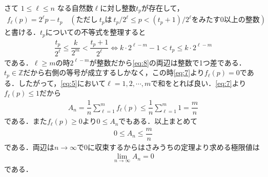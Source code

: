 \documentclass[../../main.tex]{subfiles}
\begin{document}
さて $1\le\ell\le n$ なる自然数$\ell$に対し整数$t_p$が存在して，
\begin{align}
  f_\ell(p)=2^\ell p-t_p \quad(\text{ただし}\ t_p\text{は}\ t_p/2^\ell\le p<(t_p+1)/2^\ell\text{をみたす0以上の整数}) \label{eq:7}
\end{align}
と書ける．$t_p$についての不等式を整理すると
\begin{align}
  \dfrac{t_p}{2^\ell}\le\dfrac{k}{2^m}<\dfrac{t_p+1}{2^\ell} \iff k\cdot2^{\ell-m}-1<t_p\le k\cdot2^{\ell-m} \label{eq:8}
\end{align}
である．$\ell\ge m$の時$2^{\ell-m}$が整数だから\cref{eq:8}の両辺は整数で1つ差である．$t_p\in\mathbb{Z}$だから右側の等号が成立するしかなく，この時\cref{eq:7}より$f_\ell(p)=0$である．したがって，\cref{eq:5}において$\ell=1,2,\cdots,m$で和をとれば良い．\cref{eq:7}より$f_{\ell}(p) \le 1$だから
\begin{align}
  A_n = \dfrac{1}{n}\sum_{\ell=1}^{m}f_{\ell}(p) \le \dfrac{1}{n}\sum_{\ell=1}^{m} 1 = \dfrac{m}{n}
\end{align}
である．また$f_{\ell}(p) \ge 0$より$0 \le A_n$でもある．以上まとめて
\begin{align}
  0 \le A_n \le \dfrac{m}{n}
\end{align}
である．両辺は$n\to\infty$で$0$に収束するからはさみうちの定理より求める極限値は
\begin{align}
  \lim_{n\to\infty} A_n = 0
\end{align}
である．


\newpage
\end{document}
